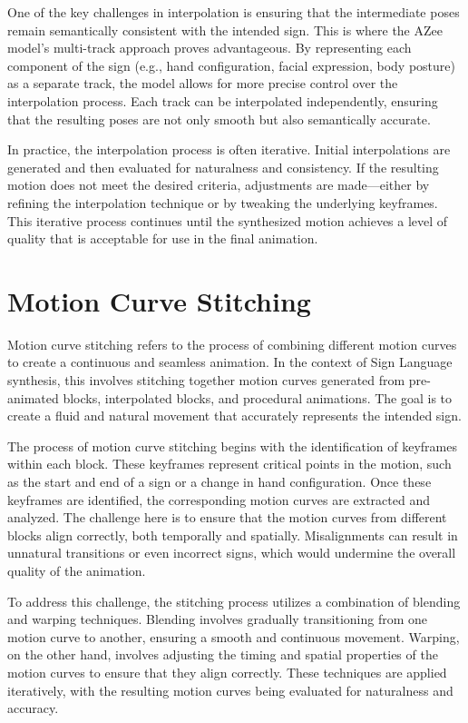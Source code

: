 \documentclass[../../main.tex]{subfiles}
\begin{document}
One of the key challenges in interpolation is ensuring that the intermediate poses remain semantically consistent with the intended sign. This is where the AZee model's multi-track approach proves advantageous. By representing each component of the sign (e.g., hand configuration, facial expression, body posture) as a separate track, the model allows for more precise control over the interpolation process. Each track can be interpolated independently, ensuring that the resulting poses are not only smooth but also semantically accurate.

In practice, the interpolation process is often iterative. Initial interpolations are generated and then evaluated for naturalness and consistency. If the resulting motion does not meet the desired criteria, adjustments are made—either by refining the interpolation technique or by tweaking the underlying keyframes. This iterative process continues until the synthesized motion achieves a level of quality that is acceptable for use in the final animation.

\section{Motion Curve Stitching}

Motion curve stitching refers to the process of combining different motion curves to create a continuous and seamless animation. In the context of Sign Language synthesis, this involves stitching together motion curves generated from pre-animated blocks, interpolated blocks, and procedural animations. The goal is to create a fluid and natural movement that accurately represents the intended sign.

The process of motion curve stitching begins with the identification of keyframes within each block. These keyframes represent critical points in the motion, such as the start and end of a sign or a change in hand configuration. Once these keyframes are identified, the corresponding motion curves are extracted and analyzed. The challenge here is to ensure that the motion curves from different blocks align correctly, both temporally and spatially. Misalignments can result in unnatural transitions or even incorrect signs, which would undermine the overall quality of the animation.

To address this challenge, the stitching process utilizes a combination of blending and warping techniques. Blending involves gradually transitioning from one motion curve to another, ensuring a smooth and continuous movement. Warping, on the other hand, involves adjusting the timing and spatial properties of the motion curves to ensure that they align correctly. These techniques are applied iteratively, with the resulting motion curves being evaluated for naturalness and accuracy.
\end{document}
